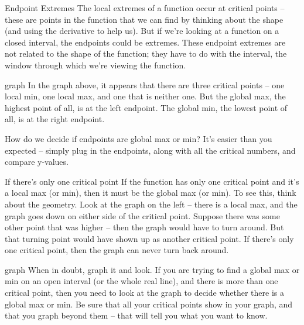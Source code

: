 Endpoint Extremes
The local extremes of a function occur at critical points – these are points in the function that we can find by thinking about the shape (and using the derivative to help us). But if we’re looking at a function on a closed interval, the endpoints could be extremes. These endpoint extremes are not related to the shape of the function; they have to do with the interval, the window through which we’re viewing the function.

graph
In the graph above, it appears that there are three critical points – one local min, one local max, and one that is neither one. But the global max, the highest point of all, is at the left endpoint. The global min, the lowest point of all, is at the right endpoint.

How do we decide if endpoints are global max or min? It’s easier than you expected – simply plug in the endpoints, along with all the critical numbers, and compare y-values.


If there's only one critical point
If the function has only one critical point and it’s a local max (or min), then it must be the global max (or min). To see this, think about the geometry. Look at the graph on the left – there is a local max, and the graph goes down on either side of the critical point. Suppose there was some other point that was higher – then the graph would have to turn around. But that turning point would have shown up as another critical point. If there’s only one critical point, then the graph can never turn back around.

graph
When in doubt, graph it and look.
If you are trying to find a global max or min on an open interval (or the whole real line), and there is more than one critical point, then you need to look at the graph to decide whether there is a global max or min. Be sure that all your critical points show in your graph, and that you graph beyond them – that will tell you what you want to know.

